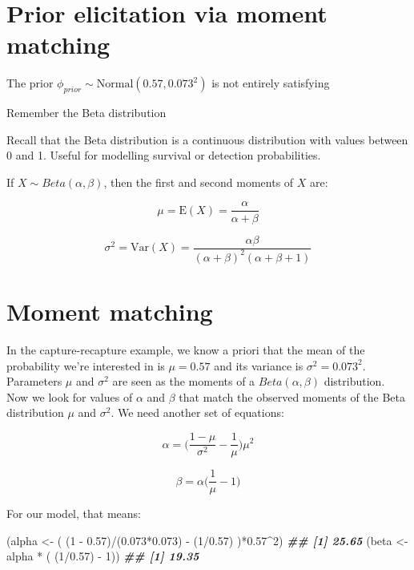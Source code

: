 \documentclass[
  12pt,
]{krantz}
\newenvironment{Shaded}{\begin{snugshade}}{\end{snugshade}}
\newcommand{\DecValTok}[1]{\textcolor[rgb]{0.00,0.00,0.81}{#1}}
\newcommand{\DocumentationTok}[1]{\textcolor[rgb]{0.56,0.35,0.01}{\textbf{\textit{#1}}}}
\newcommand{\FloatTok}[1]{\textcolor[rgb]{0.00,0.00,0.81}{#1}}
\newcommand{\NormalTok}[1]{#1}
\newcommand{\OtherTok}[1]{\textcolor[rgb]{0.56,0.35,0.01}{#1}}
\newcommand{\SpecialCharTok}[1]{\textcolor[rgb]{0.00,0.00,0.00}{#1}}
\begin{document}
\hypertarget{prior-elicitation-via-moment-matching}{%
\section{Prior elicitation via moment matching}\label{prior-elicitation-via-moment-matching}}

The prior \(\phi_{prior} \sim \text{Normal}(0.57,0.073^2)\) is not entirely satisfying

Remember the Beta distribution

Recall that the Beta distribution is a continuous distribution with values between 0 and 1. Useful for modelling survival or detection probabilities.

If \(X \sim Beta(\alpha,\beta)\), then the first and second moments of \(X\) are:

\[\mu = \text{E}(X) = \frac{\alpha}{\alpha + \beta}\]

\[\sigma^2 = \text{Var}(X) = \frac{\alpha\beta}{(\alpha + \beta)^2 (\alpha + \beta + 1)}\]

\hypertarget{moment-matching}{%
\section{Moment matching}\label{moment-matching}}

In the capture-recapture example, we know a priori that the mean of the probability we're interested in is \(\mu = 0.57\) and its variance is \(\sigma^2 = 0.073^2\). Parameters \(\mu\) and \(\sigma^2\) are seen as the moments of a \(Beta(\alpha,\beta)\) distribution. Now we look for values of \(\alpha\) and \(\beta\) that match the observed moments of the Beta distribution \(\mu\) and \(\sigma^2\). We need another set of equations:

\[\alpha = \bigg(\frac{1-\mu}{\sigma^2}- \frac{1}{\mu} \bigg)\mu^2\]

\[\beta = \alpha \bigg(\frac{1}{\mu}-1\bigg)\]

For our model, that means:

\begin{Shaded}
\begin{Highlighting}[]
\NormalTok{(alpha }\OtherTok{\textless{}{-}}\NormalTok{ ( (}\DecValTok{1} \SpecialCharTok{{-}} \FloatTok{0.57}\NormalTok{)}\SpecialCharTok{/}\NormalTok{(}\FloatTok{0.073}\SpecialCharTok{*}\FloatTok{0.073}\NormalTok{) }\SpecialCharTok{{-}}\NormalTok{ (}\DecValTok{1}\SpecialCharTok{/}\FloatTok{0.57}\NormalTok{) )}\SpecialCharTok{*}\FloatTok{0.57}\SpecialCharTok{\^{}}\DecValTok{2}\NormalTok{)}
\DocumentationTok{\#\# [1] 25.65}
\NormalTok{(beta }\OtherTok{\textless{}{-}}\NormalTok{ alpha }\SpecialCharTok{*}\NormalTok{ ( (}\DecValTok{1}\SpecialCharTok{/}\FloatTok{0.57}\NormalTok{) }\SpecialCharTok{{-}} \DecValTok{1}\NormalTok{))}
\DocumentationTok{\#\# [1] 19.35}
\end{Highlighting}
\end{Shaded}
\end{document}
